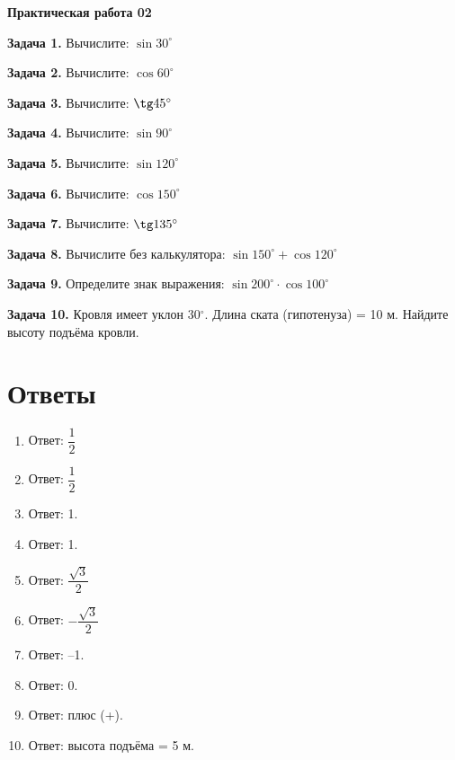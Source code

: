 \documentclass{umk-matematika}
\begin{document}
\begin{center}
{\Large\bfseries Практическая работа 02}
\end{center}
\vspace{0.5cm}

\textbf{Задача 1.} Вычислите: $\sin 30^\circ$\par\vspace{10pt}
\textbf{Задача 2.} Вычислите: $\cos 60^\circ$\par\vspace{10pt}
\textbf{Задача 3.} Вычислите: $\tg 45^\circ$\par\vspace{10pt}
\textbf{Задача 4.} Вычислите: $\sin 90^\circ$\par\vspace{10pt}
\textbf{Задача 5.} Вычислите: $\sin 120^\circ$\par\vspace{10pt}
\textbf{Задача 6.} Вычислите: $\cos 150^\circ$\par\vspace{10pt}
\textbf{Задача 7.} Вычислите: $\tg 135^\circ$\par\vspace{10pt}
\textbf{Задача 8.} Вычислите без калькулятора: $\sin 150^\circ + \cos 120^\circ$\par\vspace{10pt}
\textbf{Задача 9.} Определите знак выражения: $\sin 200^\circ \cdot \cos 100^\circ$\par\vspace{10pt}
\textbf{Задача 10.} Кровля имеет уклон 30$^\circ$. Длина ската (гипотенуза) = 10 м. Найдите высоту подъёма кровли.\par\vspace{10pt}
\newpage
\section*{Ответы}

\begin{enumerate}
  \item Ответ: $\dfrac{1}{2}$
  \item Ответ: $\dfrac{1}{2}$
  \item Ответ: 1.
  \item Ответ: 1.
  \item Ответ: $\dfrac{\sqrt{3}}{2}$
  \item Ответ: $-\dfrac{\sqrt{3}}{2}$
  \item Ответ: –1.
  \item Ответ: 0.
  \item Ответ: плюс (+).
  \item Ответ: высота подъёма = 5 м.
\end{enumerate}
\end{document}
